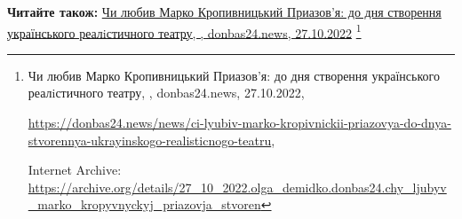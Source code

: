  
 
 
 
 

\def\pubIA{https://archive.org/details/27_10_2022.olga_demidko.donbas24.chy_ljubyv_marko_kropyvnyckyj_priazovja_stvoren}
\def\pubTitle{Чи любив Марко Кропивницький Приазов'я: до дня створення українського реалiстичного театру}
\def\pubDate{27.10.2022}
\def\pubOrigin{https://donbas24.news/news/ci-lyubiv-marko-kropivnickii-priazovya-do-dnya-stvorennya-ukrayinskogo-realisticnogo-teatru}
\def\pubAuthor{\pubAuthorDemidko}
\def\pubSite{donbas24.news}

\textbf{Читайте також:} \href{\pubIA}{%
\pubTitle, \pubAuthor, \pubSite, \pubDate}%
\footnote{\pubTitle, \pubAuthor, \pubSite, \pubDate, \par\url{\pubOrigin}, \par Internet Archive: \url{\pubIA}}
